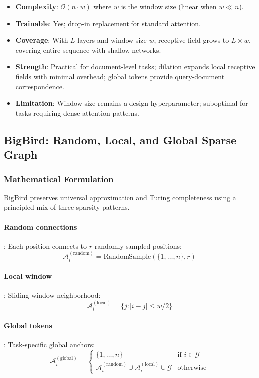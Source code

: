 \documentclass[11pt,a4paper]{article}
\begin{document}
\begin{itemize}[leftmargin=*]
    \item \textbf{Complexity}: $\mathcal{O}(n \cdot w)$ where $w$ is the window size (linear when $w \ll n$).
    \item \textbf{Trainable}: Yes; drop-in replacement for standard attention.
    \item \textbf{Coverage}: With $L$ layers and window size $w$, receptive field grows to $L \times w$, covering entire sequence with shallow networks.
    \item \textbf{Strength}: Practical for document-level tasks; dilation expands local receptive fields with minimal overhead; global tokens provide query-document correspondence.
    \item \textbf{Limitation}: Window size remains a design hyperparameter; suboptimal for tasks requiring dense attention patterns.
\end{itemize}

\subsection{BigBird: Random, Local, and Global Sparse Graph}

\subsubsection{Mathematical Formulation}

BigBird \citep{zaheer_bigbird_2020} preserves universal approximation and Turing completeness using a principled mix of three sparsity patterns.

\paragraph{Random connections}: Each position connects to $r$ randomly sampled positions:
\[
\mathcal{A}_i^{(\text{random})} = \text{RandomSample}(\{1, \ldots, n\}, r)
\]

\paragraph{Local window}: Sliding window neighborhood:
\[
\mathcal{A}_i^{(\text{local})} = \{j : |i-j| \leq w/2\}
\]

\paragraph{Global tokens}: Task-specific global anchors:
\[
\mathcal{A}_i^{(\text{global})} = \begin{cases}
\{1, \ldots, n\} & \text{if } i \in \mathcal{G} \\
\mathcal{A}_i^{(\text{random})} \cup \mathcal{A}_i^{(\text{local})} \cup \mathcal{G} & \text{otherwise}
\end{cases}
\]
\end{document}
